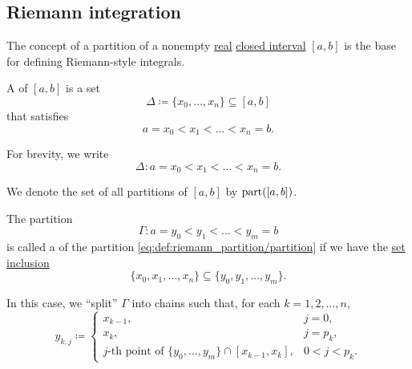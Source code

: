 \subsection{Riemann integration}\label{subsec:riemann_integration}

\begin{definition}\label{def:riemann_partition}
  The concept of a partition of a nonempty \hyperref[def:real_numbers]{real} \hyperref[def:total_order_interval/closed]{closed interval} \( [a, b] \) is the base for defining Riemann-style integrals.

  \begin{DefEnum}
     A  of \( [a, b] \) is a set
    \begin{equation*}
      \Delta \coloneqq \{ x_0, \ldots, x_n \} \subseteq [a, b]
    \end{equation*}
    that satisfies
    \begin{equation*}
      a = x_0 < x_1 < \ldots < x_n = b.
    \end{equation*}

    For brevity, we write
    \begin{equation}\label{eq:def:riemann_partition/partition}
      \Delta: a = x_0 < x_1 < \ldots < x_n = b.
    \end{equation}

    We denote the set of all partitions of \( [a, b] \) by \( \operatorname{part}([a, b]) \).

     The partition
    \begin{equation*}
      \Gamma: a = y_0 < y_1 < \ldots < y_m = b
    \end{equation*}
    is called a  of the partition \eqref{eq:def:riemann_partition/partition} if we have the \hyperref[def:subset]{set inclusion}
    \begin{equation}\label{eq:def:riemann_partition/refinement/inclusion}
      \{ x_0, x_1, \ldots, x_n \} \subseteq \{ y_0, y_1, \ldots, y_m \}.
    \end{equation}

    In this case, we \enquote{split} \( \Gamma \) into chains such that, for each \( k = 1, 2, \ldots, n \),
    \begin{equation}\label{def:riemann_partition/refinement/splitting}
      y_{k,j} \coloneqq \begin{cases}
        x_{k-1},                                                                          &j = 0, \\
        x_k,                                                                              &j = p_k, \\
        j\text{-th point of } \{ y_0, \ldots, y_m \} \cap [x_{k-1}, x_k], &0 < j < p_k.
      \end{cases}
    \end{equation}


\end{DefEnum}
\end{definition}

